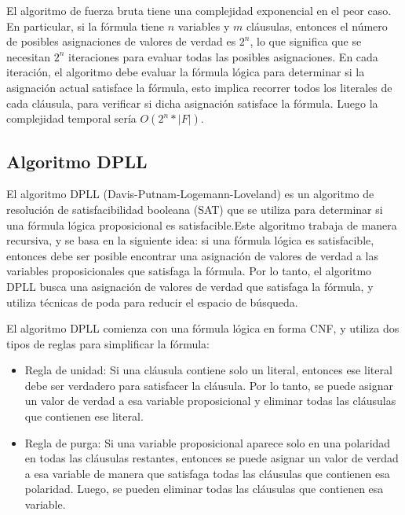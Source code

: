 \documentclass{article}
\begin{document}
            El algoritmo de fuerza bruta tiene una complejidad exponencial en el peor caso. En 
            particular, si la fórmula tiene $n$ variables y $m$ cláusulas, entonces el número
            de posibles asignaciones de valores de verdad es $2^n$, lo que significa que se necesitan 
            $2^n$ iteraciones para evaluar todas las posibles asignaciones. En cada iteración, el 
            algoritmo debe evaluar la fórmula lógica para determinar si la asignación actual satisface la 
            fórmula, esto implica recorrer todos los literales de cada cláusula, para 
            verificar si dicha asignación satisface la fórmula. Luego la complejidad temporal 
            sería $O(2^n * |F|)$.
    
    \subsection*{Algoritmo DPLL}
        El algoritmo DPLL (Davis-Putnam-Logemann-Loveland) es un algoritmo de resolución de satisfacibilidad booleana (SAT) que se utiliza 
        para determinar si una fórmula lógica proposicional es satisfacible.Este algoritmo trabaja de manera recursiva, y se basa en 
        la siguiente idea: si una fórmula lógica es satisfacible, 
        entonces debe ser posible encontrar una asignación de valores de verdad a las variables proposicionales que satisfaga la fórmula. 
        Por lo tanto, el algoritmo DPLL busca una asignación de valores de verdad que satisfaga la fórmula, y utiliza técnicas de poda para 
        reducir el espacio de búsqueda.
            
        El algoritmo DPLL comienza con una fórmula lógica en forma CNF, y utiliza dos tipos de reglas para simplificar la fórmula:
            
        \begin{itemize}
            \item Regla de unidad: Si una cláusula contiene solo un literal, entonces ese literal debe ser verdadero para 
            satisfacer la cláusula. Por lo tanto, se puede asignar un valor de verdad a esa variable proposicional y eliminar 
            todas las cláusulas que contienen ese literal.

            \item Regla de purga: Si una variable proposicional aparece solo en una polaridad en todas las cláusulas restantes, 
            entonces se puede asignar un valor de verdad a esa variable de manera que satisfaga todas las cláusulas que contienen 
            esa polaridad. Luego, se pueden eliminar todas las cláusulas que contienen esa variable.
        \end{itemize}
\end{document}
